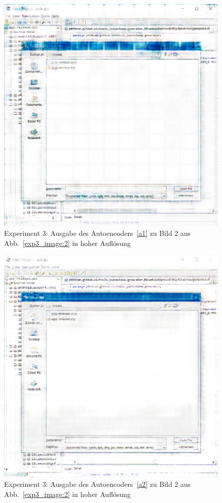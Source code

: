 \begin{figure} [ht]
  \centering
  \includegraphics[width=\textwidth]{bilder/result_exp3/2_pred_a1.png}

  \caption{Experiment 3: Ausgabe des Autoencoders~\ref{a1} zu Bild 2 aus Abb.~\ref{exp3_image:2} in hoher Auflösung}
\end{figure}

\begin{figure} [ht]
  \centering
  \includegraphics[width=\textwidth]{bilder/result_exp3/2_pred_a2.png}

  \caption{Experiment 3: Ausgabe des Autoencoders~\ref{a2} zu Bild 2 aus Abb.~\ref{exp3_image:2} in hoher Auflösung}
\end{figure}

